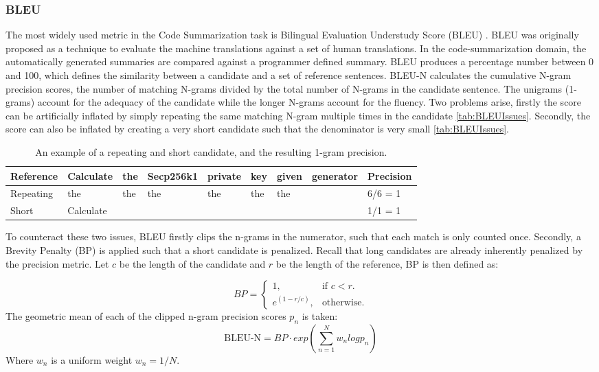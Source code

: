 \subsubsection{BLEU}
The most widely used metric in the Code Summarization task is Bilingual Evaluation Understudy Score (BLEU) \cite{evaluationSummarization}. BLEU was originally proposed as a technique to evaluate the machine translations against a set of human translations. In the code-summarization domain, the automatically generated summaries are compared against a programmer defined summary. 
BLEU produces a percentage number between 0 and 100, which defines the similarity between a candidate and a set of reference sentences. BLEU-N calculates the cumulative N-gram precision scores, the number of matching N-grams divided by the total number of N-grams in the candidate sentence. The unigrams (1-grams) account for the adequacy of the candidate while the longer N-grams account for the fluency. 
Two problems arise, firstly the score can be artificially inflated by simply repeating the same matching N-gram multiple times in the candidate \ref{tab:BLEUIssues}. Secondly, the score can also be inflated by creating a very short candidate such that the denominator is very small \ref{tab:BLEUIssues}.

\label{tab:BLEUIssues}
\begin{table}[H]
\begin{tabular}{l|lllllll|l}
\rowcolor[HTML]{C0C0C0} 
Reference & Calculate & the & Secp256k1 & private & key & given & generator & Precision \\ \hline
Repeating & the       & the & the       & the     & the & the   &           & 6/6 = 1   \\
Short     & Calculate &     &           &         &     &       &           & 1/1 = 1  
\end{tabular}
\caption{An example of a repeating and short candidate, and the resulting 1-gram precision.}
\end{table}

To counteract these two issues, BLEU firstly clips the n-grams in the numerator, such that each match is only counted once. Secondly, a Brevity Penalty (BP) is applied such that a short candidate is penalized. Recall that long candidates are already inherently penalized by the precision metric. Let \(c\) be the length of the candidate and \(r\) be the length of the reference, BP is then defined as:

\begin{equation}
  BP=\begin{cases}
    1, & \text{if $c<r$}.\\
    e^{(1 - r/c)}, & \text{otherwise}.
  \end{cases}
\end{equation}
The geometric mean of each of the clipped n-gram precision scores \(p_n\) is taken:
\[ \text{BLEU-N} = BP \cdot exp(\sum_{n=1}^{N} w_n log p_n ) \]
Where \(w_n\) is a uniform weight \(w_n = 1/N\).

